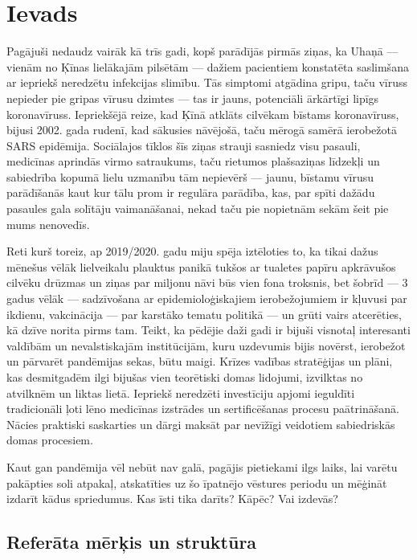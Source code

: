 \documentclass[12pt, a4paper]{article}
\numberwithin{equation}{section} %
\begin{document}

\newpage
\tableofcontents
\thispagestyle{empty}
\newpage
\setcounter{page}{3}


\section{Ievads}

Pagājuši nedaudz vairāk kā trīs gadi, kopš parādījās pirmās ziņas, ka Uhaņā --- vienām no Ķīnas lielākajām pilsētām --- dažiem pacientiem konstatēta saslimšana ar iepriekš neredzētu infekcijas slimību. Tās simptomi atgādina gripu, taču vīruss nepieder pie gripas vīrusu dzimtes --- tas ir jauns, potenciāli ārkārtīgi lipīgs koronavīruss. Iepriekšējā reize, kad Ķīnā atklāts cilvēkam bīstams koronavīruss, bijusi 2002. gada rudenī, kad sākusies nāvējošā, taču mērogā samērā ierobežotā SARS epidēmija. Sociālajos tīklos šīs ziņas strauji sasniedz visu pasauli, medicīnas aprindās virmo satraukums, taču rietumos plašsaziņas līdzekļi un sabiedrība kopumā lielu uzmanību tām nepievērš --- jaunu, bīstamu vīrusu parādīšanās kaut kur tālu prom ir regulāra parādība, kas, par spīti dažādu pasaules gala solītāju vaimanāšanai, nekad taču pie nopietnām sekām šeit pie mums nenovedīs. 

Reti kurš toreiz, ap 2019/2020. gadu miju spēja iztēloties to, ka tikai dažus mēnešus vēlāk lielveikalu plauktus panikā tukšos ar tualetes papīru apkrāvušos cilvēku drūzmas un ziņas par miljonu nāvi būs vien fona troksnis, bet šobrīd --- 3 gadus vēlāk --- sadzīvošana ar epidemioloģiskajiem ierobežojumiem ir kļuvusi par ikdienu, vakcinācija --- par karstāko tematu politikā --- un grūti vairs atcerēties, kā dzīve norita pirms tam. Teikt, ka pēdējie daži gadi ir bijuši visnotaļ interesanti valdībām un nevalstiskajām institūcijām, kuru uzdevumis bijis novērst, ierobežot un pārvarēt pandēmijas sekas, būtu maigi. Krīzes vadības stratēģijas un plāni, kas desmitgadēm ilgi bijušas vien teorētiski domas lidojumi, izvilktas no atvilknēm un liktas lietā. Iepriekš neredzēti investīciju apjomi ieguldīti tradicionāli ļoti lēno medicīnas izstrādes un sertificēšanas procesu paātrināšanā. Nācies praktiski saskarties un dārgi maksāt par nevīžīgi veidotiem sabiedriskās domas procesiem. 

Kaut gan pandēmija vēl nebūt nav galā, pagājis pietiekami ilgs laiks, lai varētu pakāpties soli atpakaļ, atskatīties uz šo īpatnējo vēstures periodu un mēģināt izdarīt kādus spriedumus. Kas īsti tika darīts? Kāpēc? Vai izdevās?


\subsection{Referāta mērķis un struktūra}
\end{document}
